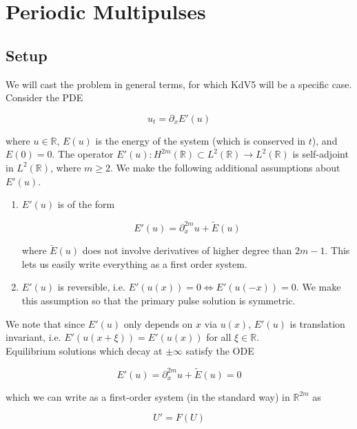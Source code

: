 \documentclass[12pt]{article}
\def\R{{\mathbb R}}
\begin{document}
\section{Periodic Multipulses}

\subsection{Setup}

We will cast the problem in general terms, for which KdV5 will be a specific case. Consider the PDE

\begin{equation}\label{genPDE}
u_t = \partial_x E'(u)
\end{equation}

where $u \in \R$, $E(u)$ is the energy of the system (which is conserved in $t$), and $E(0) = 0$. The operator $E'(u): H^{2m}(\R) \subset L^2(\R) \rightarrow L^2(\R)$ is self-adjoint in $L^2(\R)$, where $m \geq 2$. We make the following additional assumptions about $E'(u)$.

\begin{enumerate}

\item $E'(u)$ is of the form

\[
E'(u) = \partial_x^{2m}u + \tilde{E}(u)
\]

where $\tilde{E}(u)$ does not involve derivatives of higher degree than $2m-1$. This lets us easily write everything as a first order system.

\item $E'(u)$ is reversible, i.e. $E'(u(x)) = 0 \iff E'(u(-x)) = 0$. We make this assumption so that the primary pulse solution is symmetric.
\end{enumerate}

We note that since $E'(u)$ only depends on $x$ via $u(x)$, $E'(u)$ is translation invariant, i.e. $E'(u(x+\xi)) = E'(u(x))$ for all $\xi \in \R$.\\

Equilibrium solutions which decay at $\pm \infty$ satisfy the ODE 

\begin{equation}\label{ODEonR}
E'(u) = \partial_x^{2m}u + \tilde{E}(u) = 0
\end{equation}

which we can write as a first-order system (in the standard way) in $\R^{2m}$ as

\begin{equation}\label{genODE}
U' = F(U)
\end{equation}
\end{document}
